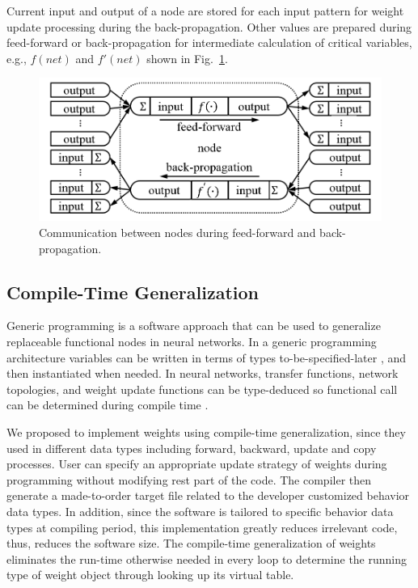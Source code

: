 \documentclass[procedia]{easychair}
\begin{document}
Current input and output of a node are stored for each input pattern for weight update processing during the back-propagation.  Other values are prepared during feed-forward or back-propagation for intermediate calculation of critical variables, e.g., $f(net)$ and $f'(net)$ shown in Fig.~\ref{fig:microscopic}.

\begin{figure}[tb]
    \begin{centering}
        \includegraphics[scale=0.5]{../pic/microscopic.png}
        \caption{Communication between nodes during feed-forward and back-propagation.}
        \label{fig:microscopic}
	\end{centering}
\end{figure}

\subsection{Compile-Time Generalization}

Generic programming is a software approach that can be used to generalize replaceable functional nodes in neural networks.   In a generic programming architecture variables can be written in terms of types to-be-specified-later  \cite{wiki:generic_programming}, and then instantiated when needed.  In neural networks, transfer functions, network topologies, and weight update functions can be type-deduced so functional call can be determined during compile time  \cite{alexandrescu2001preface}.

We proposed to implement weights using compile-time generalization, since they used in different data types including forward, backward, update and copy processes.  User can specify an appropriate update strategy of weights during programming without modifying rest part of the code.  The compiler then generate a made-to-order target file related to the developer customized behavior data types.  In addition, since the software is tailored to specific behavior data types at compiling period, this implementation greatly reduces irrelevant code, thus, reduces the software size.   The compile-time generalization of weights eliminates the run-time otherwise needed in every loop to determine the running type of weight object through looking up its virtual table.
\end{document}
